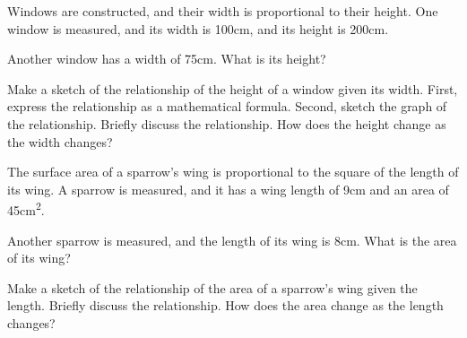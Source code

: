 \begin{problem}
  \clearpage

\item Windows are constructed, and their width is proportional to
  their height. One window is measured, and its width is 100cm, and its
  height is 200cm. 

  \begin{subproblem}

  \item Another window has a width of 75cm. What is its height?

    \vfill

  \item Make a sketch of the relationship of the height of a window
    given its width. First, express the relationship as a mathematical
    formula. Second, sketch the graph of the relationship. Briefly
    discuss the relationship. How does the height change as the width
    changes?  

    \vfill
    
  \end{subproblem}

  \clearpage

\item The surface area of a sparrow's wing is proportional to the
  square of the length of its wing. A sparrow is measured, and it has
  a wing length of 9cm and an area of 45cm\textsuperscript{2}. 

  \begin{subproblem}

  \item Another sparrow is measured, and the length of its wing is
    8cm. What is the area of its wing?

    \vfill

  \item Make a sketch of the relationship of the area of a sparrow's
    wing given the length. Briefly discuss the relationship. How does
    the area change as the length changes?  

    \vfill

  \end{subproblem}

  \vfill



\end{problem}

\postClass

